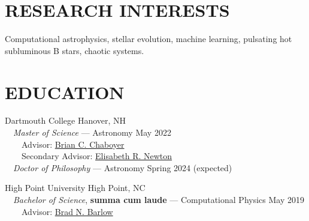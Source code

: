 \documentclass[margin, 10pt]{res} %
\begin{document}
\begin{resume}

 
\section{RESEARCH INTERESTS}  
Computational astrophysics, stellar evolution, machine learning, pulsating hot subluminous B stars, chaotic systems.
 

\section{EDUCATION}
{\large Dartmouth College} \hfill Hanover, NH\\
{\-\ \-\ \small \textit{Master of Science} --- Astronomy} \hfill May 2022\\
{\-\ \-\ \-\ \-\ \small Advisor: \href{https://physics.dartmouth.edu/people/brian-charles-chaboyer}{Brian C. Chaboyer}} \\
{\-\ \-\ \-\ \-\ \small Secondary Advisor: \href{https://physics.dartmouth.edu/people/elisabeth-newton}{Elisabeth R. Newton}} \\
{\-\ \-\ \small \textit{Doctor of Philosophy} –-- Astronomy} \hfill Spring 2024 (expected)

{\large High Point University} \hfill High Point, NC\\
	{\-\ \-\ \small \textit{Bachelor of Science}, \textbf{summa cum laude} --- Computational Physics} \hfill May 2019\\
{\-\ \-\ \-\ \-\ \small Advisor: \href{http://linus.highpoint.edu/~bbarlow/}{Brad N. Barlow}} \\


\end{resume}
\end{document}
